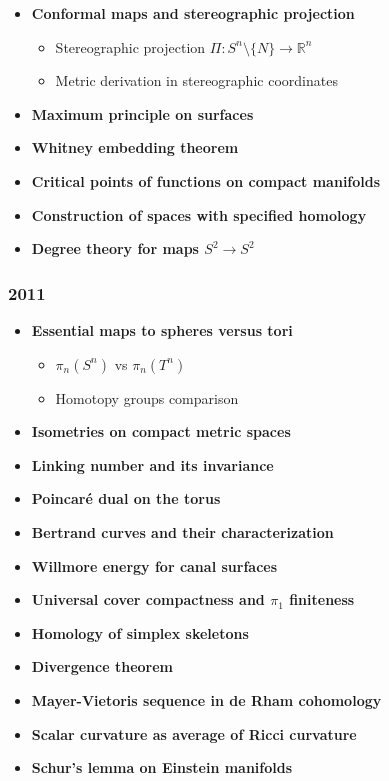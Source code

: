\begin{itemize}
    \item \textbf{Conformal maps and stereographic projection}
        \begin{itemize}
            \item Stereographic projection $\Pi: S^n \setminus \{N\} \to \mathbb{R}^n$
            \item Metric derivation in stereographic coordinates
        \end{itemize}
    \item \textbf{Maximum principle on surfaces}
    \item \textbf{Whitney embedding theorem}
    \item \textbf{Critical points of functions on compact manifolds}
    \item \textbf{Construction of spaces with specified homology}
    \item \textbf{Degree theory for maps $S^2 \to S^2$}
\end{itemize}

\subsubsection*{2011}
\begin{itemize}
    \item \textbf{Essential maps to spheres versus tori}
        \begin{itemize}
            \item $\pi_n(S^n)$ vs $\pi_n(T^n)$
            \item Homotopy groups comparison
        \end{itemize}
    \item \textbf{Isometries on compact metric spaces}
    \item \textbf{Linking number and its invariance}
    \item \textbf{Poincaré dual on the torus}
    \item \textbf{Bertrand curves and their characterization}
    \item \textbf{Willmore energy for canal surfaces}
    \item \textbf{Universal cover compactness and $\pi_1$ finiteness}
    \item \textbf{Homology of simplex skeletons}
    \item \textbf{Divergence theorem}
    \item \textbf{Mayer-Vietoris sequence in de Rham cohomology}
    \item \textbf{Scalar curvature as average of Ricci curvature}
    \item \textbf{Schur's lemma on Einstein manifolds}
\end{itemize}

